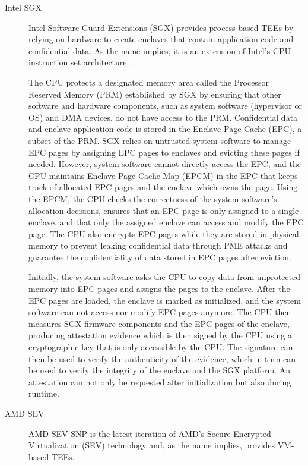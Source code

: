 \begin{description}
  \item[Intel SGX]
    Intel Software Guard Extensions (SGX) provides process-based TEEs by relying
    on hardware to create enclaves that contain application code and
    confidential data. As the name implies, it is an extension of Intel's CPU
    instruction set architecture \cite{costan2016sgx}.

    The CPU protects a designated memory area called the Processor Reserved
    Memory (PRM) established by SGX by ensuring that other software and hardware
    components, such as system software (hypervisor or OS) and DMA devices, do
    not have access to the PRM. Confidential data and enclave application code
    is stored in the Enclave Page Cache (EPC), a subset of the PRM. SGX relies
    on untrusted system software to manage EPC pages by assigning EPC pages to
    enclaves and evicting these pages if needed. However, system software cannot
    directly access the EPC, and the CPU maintains Enclave Page Cache Map (EPCM)
    in the EPC that keeps track of allocated EPC pages and the enclave which
    owns the page. Using the EPCM, the CPU checks the correctness of the system
    software's allocation decisions, ensures that an EPC page is only assigned
    to a single enclave, and that only the assigned enclave can access and
    modify the EPC page. The CPU also encrypts EPC pages while they are stored
    in physical memory to prevent leaking confidential data through PME attacks
    and guarantee the confidentiality of data stored in EPC pages after
    eviction.

    Initially, the system software asks the CPU to copy data from unprotected
    memory into EPC pages and assigns the pages to the enclave. After the EPC
    pages are loaded, the enclave is marked as initialized, and the system
    software can not access nor modify EPC pages anymore. The CPU then measures
    SGX firmware components and the EPC pages of the enclave, producing
    attestation evidence which is then signed by the CPU using a cryptographic
    key that is only accessible by the CPU. The signature can then be used to
    verify the authenticity of the evidence, which in turn can be used to verify
    the integrity of the enclave and the SGX platform. An attestation can not
    only be requested after initialization but also during runtime.

  \item[AMD SEV]
    AMD SEV-SNP is the latest iteration of AMD's Secure Encrypted Virtualization
    (SEV) technology \cite{amd2021sev, amd2017seves, amd2020sevsnp} and, as the
    name implies, provides VM-based TEEs.


\end{description}
